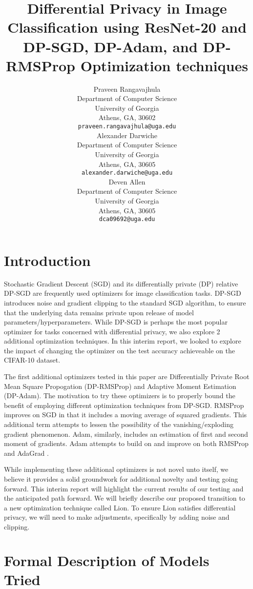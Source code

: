 \documentclass{article}
\title{Differential Privacy in Image Classification using ResNet-20 and DP-SGD, DP-Adam, and DP-RMSProp Optimization techniques}
\author{
    Praveen Rangavajhula\\
    Department of Computer Science\\
    University of Georgia\\
    Athens, GA, 30602\\
    \texttt{praveen.rangavajhula@uga.edu} \\
    \And
    Alexander Darwiche\\
    Department of Computer Science\\
    University of Georgia\\
    Athens, GA, 30605 \\
    \texttt{alexander.darwiche@uga.edu} \\
    \And
    Deven Allen\\
    Department of Computer Science\\
    University of Georgia\\
    Athens, GA, 30605 \\
    \texttt{dca09692@uga.edu} \\
}
\begin{document}
    \maketitle
    \begin{abstract}
    

    \end{abstract}


    \section{Introduction}\label{sec:introduction}
    
    Stochastic Gradient Descent (SGD) and its differentially private (DP) relative DP-SGD are frequently used optimizers for image classification tasks. DP-SGD
    introduces noise and gradient clipping to the standard SGD algorithm, to ensure that the underlying data remains private upon release of model parameters/hyperparameters. While DP-SGD
    is perhaps the most popular optimizer for tasks concerned with differential privacy, we also explore 2 additional optimization techniques. In this interim report, 
    we looked to explore the impact of changing the optimizer on the test accuracy achieveable on the CIFAR-10 dataset.
  
    The first additional optimizers tested in this paper are Differentially Private Root Mean Square Propogation (DP-RMSProp) and Adaptive Moment Estimation (DP-Adam). The motivation to try these optimizers is to properly bound
    the benefit of employing different optimization techniques from DP-SGD. RMSProp improves on SGD in that it includes a moving average of squared gradients. This additional term attempts to lessen the possibility of the
    vanishing/exploding gradient phenomenon. Adam, similarly, includes an estimation of first and second moment of gradients. Adam attempts to build on and improve on both RMSProp and AdaGrad \cite{kingma2017adammethodstochasticoptimization}.

    While implementing these additional optimizers is not novel unto itself, we believe it provides a solid groundwork for additional novelty and testing going forward. This interim report will
    highlight the current results of our testing and the anticipated path forward. We will briefly describe our proposed transition to a new optimization technique called Lion. To ensure Lion satisfies
    differential privacy, we will need to make adjustments, specifically by adding noise and clipping.

    \section{Formal Description of Models Tried}\label{sec:models}
    
\end{document}
